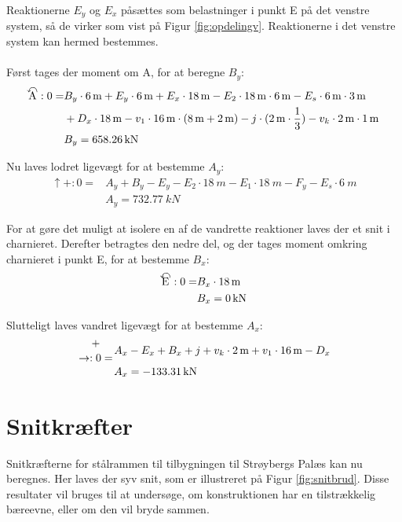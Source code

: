 Reaktionerne $E_y$ og $E_x$ påsættes som belastninger i punkt E på det venstre system, så de virker som vist på Figur \ref{fig:opdelingv}. Reaktionerne i det venstre system kan hermed bestemmes.
\\
\\
Først tages der moment om A, for at beregne $B_y$:
\begin{equation}
\begin{split}
	\ALN{\text{A}}: 0 = & B_y \cdot \SI{6}{m} + E_y \cdot \SI{6}{m} + E_x \cdot \SI{18}{m} - E_2 \cdot \SI{18}{m} \cdot \SI{6}{m} - E_s \cdot \SI{6}{m} \cdot \SI{3}{m} \\ & + D_x \cdot \SI{18}{m} - v_1 \cdot \SI{16}{m} \cdot (\SI{8}{m} + \SI{2}{m}) - j \cdot (\SI{2}{m} \cdot \frac{1}{3}) - v_k \cdot \SI{2}{m} \cdot \SI{1}{m}
	\\ &
	B_y = \SI{658,26}{kN}
\end{split}
\end{equation}

Nu laves lodret ligevægt for at bestemme $A_y$:
\begin{equation}
\begin{split}
	\uparrow+: 0 = & A_y + B_y - E_y - E_2 \cdot \SI{18}{m} - E_1 \cdot \SI{18}{m} - F_y - E_s \cdot \SI{6}{m}
	\\ &
	A_y = \SI{732,77}{kN}
\end{split}
\end{equation}

For at gøre det muligt at isolere en af de vandrette reaktioner laves der et snit i charnieret. Derefter betragtes den nedre del, og der tages moment omkring charnieret i punkt E, for at bestemme $B_x$:
\begin{equation}
\begin{split}
	\ALN{\text{E}}: 0 = & B_x \cdot \SI{18}{m}
	\\ &
	B_x = \SI{0}{kN}
\end{split}
\end{equation}

Slutteligt laves vandret ligevægt for at bestemme $A_x$:
\begin{equation}
\begin{split}
	+\atop\rightarrow: 0 = & A_x - E_x + B_x + j + v_k \cdot \SI{2}{m} + v_1 \cdot \SI{16}{m} - D_x
	\\ &
	A_x = \SI{-133,31}{kN}
\end{split}
\end{equation} 

\section{Snitkræfter}
Snitkræfterne for stålrammen til tilbygningen til Strøybergs Palæs kan nu beregnes. Her laves der syv snit, som er illustreret på Figur \ref{fig:snitbrud}. Disse resultater vil bruges til at undersøge, om konstruktionen har en tilstrækkelig bæreevne, eller om den vil bryde sammen. 

